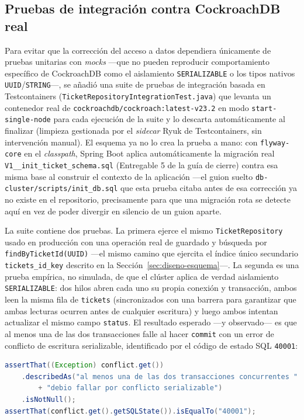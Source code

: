 \subsection{Pruebas de integración contra CockroachDB real}

Para evitar que la corrección del acceso a datos dependiera únicamente de pruebas unitarias con
\emph{mocks} —que no pueden reproducir comportamiento específico de CockroachDB como el
aislamiento \texttt{SERIALIZABLE} o los tipos nativos \texttt{UUID}/\texttt{STRING}—, se añadió una
suite de pruebas de integración basada en Testcontainers
(\texttt{TicketRepositoryIntegrationTest.java}) que levanta un contenedor real de
\texttt{cockroachdb/cockroach:latest-v23.2} en modo \texttt{start-single-node} para cada ejecución
de la suite y lo descarta automáticamente al finalizar (limpieza gestionada por el
\emph{sidecar} Ryuk de Testcontainers, sin intervención manual). El esquema ya no lo crea la
prueba a mano: con \texttt{flyway-core} en el \emph{classpath}, Spring Boot aplica
automáticamente la migración real
\texttt{V1\_\_init\_ticket\_schema.sql} (Entregable 5 de la guía de cierre) contra esa misma base
al construir el contexto de la aplicación —el guion suelto \texttt{db-cluster/scripts/init\_db.sql}
que esta prueba citaba antes de esa corrección ya no existe en el repositorio, precisamente para
que una migración rota se detecte aquí en vez de poder divergir en silencio de un guion aparte.

La suite contiene dos pruebas. La primera ejerce el mismo \texttt{TicketRepository} usado en
producción con una operación real de guardado y búsqueda por \texttt{findByTicketId(UUID)} —el
mismo camino que ejercita el índice único secundario \texttt{tickets\_id\_key} descrito en la
Sección~\ref{sec:diseno-esquema}—. La segunda es una prueba empírica, no simulada, de que el
clúster aplica de verdad aislamiento \texttt{SERIALIZABLE}: dos hilos abren cada uno su propia
conexión y transacción, ambos leen la misma fila de \texttt{tickets} (sincronizados con una
barrera para garantizar que ambas lecturas ocurren antes de cualquier escritura) y luego ambos
intentan actualizar el mismo campo \texttt{status}. El resultado esperado —y observado— es que al
menos una de las dos transacciones falle al hacer \texttt{commit} con un error de conflicto de
escritura serializable, identificado por el código de estado SQL \texttt{40001}:

\begin{lstlisting}[language=Java, caption={Extracto de la prueba de conflicto serializable}, label={lst:testcontainers}]
assertThat((Exception) conflict.get())
    .describedAs("al menos una de las dos transacciones concurrentes "
        + "debio fallar por conflicto serializable")
    .isNotNull();
assertThat(conflict.get().getSQLState()).isEqualTo("40001");
\end{lstlisting}

